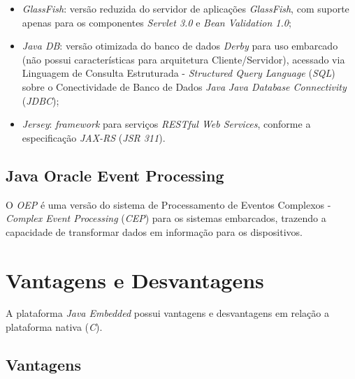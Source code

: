 \begin{itemize}

    \item \textit{GlassFish}: versão reduzida do servidor de aplicações
    \textit{GlassFish}, com suporte apenas para os componentes \textit{Servlet
    3.0} e \textit{Bean Validation 1.0};

    \item \textit{Java DB}: versão otimizada do banco de dados \textit{Derby}
    para uso embarcado (não possui características para arquitetura
    Cliente/Servidor), acessado via Linguagem de Consulta Estruturada -
    \textit{Structured Query Language} (\textit{SQL}) sobre o Conectividade de
    Banco de Dados \textit{Java} \textit{Java Database Connectivity}
    (\textit{JDBC});

    \item \textit{Jersey}: \textit{framework} para serviços \textit{RESTful Web
    Services}, conforme a especificação \textit{JAX-RS} (\textit{JSR 311}).

\end{itemize}

\subsection{Java Oracle Event Processing}

O \textit{OEP} é uma versão do sistema de Processamento de Eventos Complexos -
\textit{Complex Event Processing} (\textit{CEP}) para os sistemas embarcados,
trazendo a capacidade de transformar dados em informação para os dispositivos.

\section{Vantagens e Desvantagens}

A plataforma \textit{Java Embedded} possui vantagens e desvantagens em relação
a plataforma nativa (\textit{C}).

\newpage
\subsection{Vantagens}

